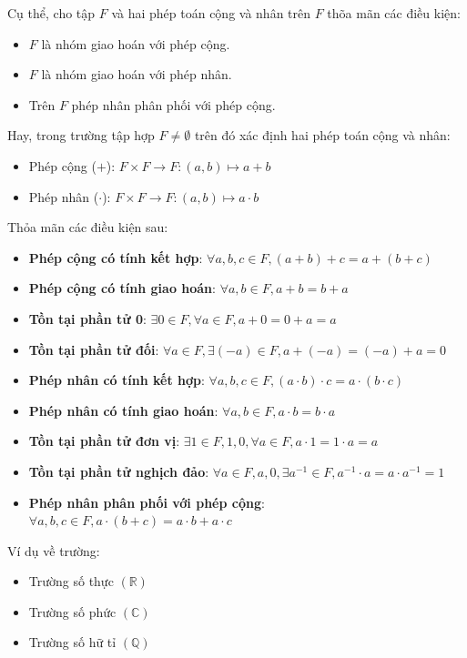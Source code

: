 \documentclass[a4paper,12pt]{report}
\begin{document}
Cụ thể, cho tập $F$ và hai phép toán cộng và nhân trên $F$ thõa mãn các điều kiện:
\begin{itemize}
\item $F$ là nhóm giao hoán với phép cộng.
\item $F$ là nhóm giao hoán với phép nhân.
\item Trên $F$ phép nhân phân phối với phép cộng.
\end{itemize}
Hay, trong trường tập hợp $F \neq \emptyset$ trên đó xác định hai phép toán cộng và nhân:
\begin{itemize}
\item Phép cộng ($+$): $F \times F \rightarrow F: (a,b)\mapsto a + b$
\item Phép nhân ($\cdot$): $F \times F \rightarrow F: (a,b)\mapsto a \cdot b$
\end{itemize}
Thỏa mãn các điều kiện sau:
\begin{itemize}
\item \textbf{Phép cộng có tính kết hợp}: $\forall a, b, c \in F, (a + b) + c = a + (b + c)$
\item \textbf{Phép cộng có tính giao hoán}: $\forall a, b \in F, a + b = b + a$
\item \textbf{Tồn tại phần tử 0}: $\exists 0 \in F, \forall a \in F, a + 0 = 0 + a = a$
\item \textbf{Tồn tại phần tử đối}: $\forall a \in F, \exists (-a) \in F, a + (-a) = (-a) + a = 0$
\item \textbf{Phép nhân có tính kết hợp}: $\forall a, b, c \in F, (a \cdot b) \cdot c = a \cdot (b \cdot c)$
\item \textbf{Phép nhân có tính giao hoán}: $\forall a, b \in F, a \cdot b = b \cdot a$
\item \textbf{Tồn tại phần tử đơn vị}: $\exists 1 \in F, 1 , 0, \forall a \in F, a \cdot 1 = 1 \cdot a = a$
\item \textbf{Tồn tại phần tử nghịch đảo}: $\forall a \in F, a , 0, \exists a^{-1} \in F, a^{-1} \cdot a = a \cdot a^{-1} = 1$
\item \textbf{Phép nhân phân phối với phép cộng}: $\forall a, b, c \in F, a \cdot (b + c) = a \cdot b + a \cdot c$
\end{itemize}
Ví dụ về trường:
\begin{itemize}
\item Trường số thực $(\mathbb{R})$
\item Trường số phức $(\mathbb{C})$
\item Trường số hữ tỉ $(\mathbb{Q})$
\end{itemize}
\end{document}
